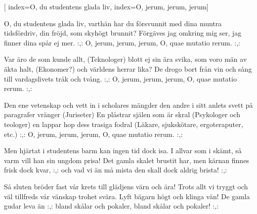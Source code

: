 [
	index={O, du studentens glada liv},
	index={O, jerum, jerum, jerum}]

\beginverse* 
O, du studentens glada liv,
varthän har du försvunnit
med dina muntra tidsfördriv,
din fröjd, som skyhögt brunnit?
Förgäves jag omkring mig ser,
jag finner dina spår ej mer.
:,: O, jerum, jerum, jerum,
O, quae mutatio rerum. :,:
\endverse

\beginverse* 
Var äro de som kunde allt, (Teknologer)
blott ej sin ära svika,
som voro män av äkta halt, (Ekonomer?)
och världens herrar lika?
De drogo bort från vin och sång
till vardagslivets tråk och tvång.
:,: O, jerum, jerum, jerum,
O, quae mutatio rerum. :,:
\endverse

\beginverse* 
Den ene vetenskap och vett
in i scholares mängder
den andre i sitt anlets svett
på paragrafer vränger  (Juriseter)
En plåstrar själen som är skral (Psykologer och teologer)
en lappar hop dess trasiga fodral (Läkare, sjukskötare, ergoteraputer, etc.)
:,: O, jerum, jerum, jerum,
O, quae mutatio rerum. :,:
\endverse


\beginverse* 
Men hjärtat i studentens barm
kan ingen tid dock isa.
I allvar som i skämt, så varm
vill han sin ungdom prisa!
Det gamla skalet brustit har,
men kärnan finnes frisk dock kvar,
:,: och vad vi än må mista
den skall dock aldrig brista! :,:
\endverse

\beginverse* 
Så sluten bröder fast vår krets
till glädjens värn och ära!
Trots allt vi tryggt och väl tillfreds
vår vänskap trohet svära.
Lyft bägarn högt och klinga vän!
De gamla gudar leva än 
:,: bland skålar och pokaler,
bland skålar och pokaler! :,: 
\endverse
\endsong



